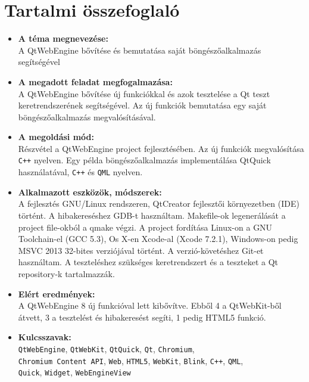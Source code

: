 \documentclass[12pt]{report}
\def\title{A QtWebEngine bővítése és bemutatása saját böngészőalkalmazás segítségével}
\begin{document}
\chapter*{Tartalmi összefoglaló}
\begin{itemize}
    \item \textbf{A téma megnevezése:} \\
        \title
    \item \textbf{A megadott feladat megfogalmazása:} \\
        A QtWebEngine bővítése új funkciókkal és azok tesztelése a
        Qt teszt keretrendszerének segítségével. Az új funkciók bemutatása
        egy saját böngészőalkalmazás megvalósításával.
    \item \textbf{A megoldási mód:} \\
        Részvétel a QtWebEngine project fejlesztésében. Az új funkciók
        megvalósítása \texttt{C++} nyelven. Egy példa böngészőalkalmazás implementálása
        QtQuick használatával, \texttt{C++} és \texttt{QML} nyelven.
    \item \textbf{Alkalmazott eszközök, módszerek:} \\
        A fejlesztés GNU/Linux rendszeren, QtCreator fejlesztői
        környezetben (IDE) történt. A hibakereséshez GDB-t használtam.
        Makefile-ok legenerálását a project file-okból a qmake végzi.
        A project fordítása Linux-on a GNU Toolchain-el (GCC 5.3),
        Os X-en Xcode-al (Xcode 7.2.1), Windows-on pedig
        MSVC 2013 32-bites verziójával történt. A verzió-követéshez Git-et
        használtam. A teszteléshez szükséges keretrendszert és a teszteket a Qt
        repository-k tartalmazzák.
    \item \textbf{Elért eredmények:} \\
        A QtWebEngine 8 új funkcióval lett kibővítve. Ebből 4 a QtWebKit-ből
        átvett, 3 a tesztelést és hibakeresést segíti, 1 pedig HTML5 funkció.
    \item \textbf{Kulcsszavak:} \\
        \texttt{QtWebEngine}, \texttt{QtWebKit}, \texttt{QtQuick}, \texttt{Qt},
        \texttt{Chromium}, \\
        \texttt{Chromium Content API}, \texttt{Web}, \texttt{HTML5}, \texttt{WebKit},
        \texttt{Blink}, \texttt{C++}, \texttt{QML},\\
        \texttt{Quick}, \texttt{Widget}, \texttt{WebEngineView}
\end{itemize}
\end{document}
